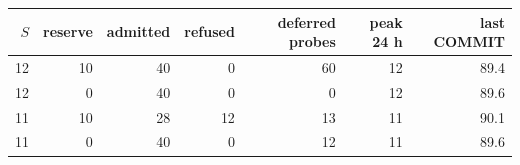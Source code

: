 \begin{tabular}{rrrrrrr}
\toprule
$S$ & reserve & admitted & refused & deferred probes & peak 24 h & last COMMIT\\
\midrule
12 & 10 & 40 & 0 & 60 & 12 & 89.4\\
12 & 0 & 40 & 0 & 0 & 12 & 89.6\\
11 & 10 & 28 & 12 & 13 & 11 & 90.1\\
11 & 0 & 40 & 0 & 12 & 11 & 89.6\\
\bottomrule
\end{tabular}
